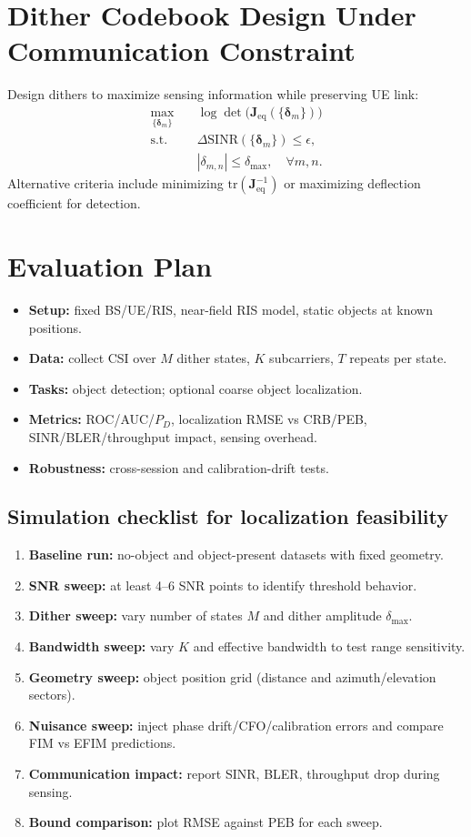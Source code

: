 \documentclass[11pt,a4paper]{article}
\newcommand{\tr}{\mathrm{tr}}
\begin{document}
\section{Dither Codebook Design Under Communication Constraint}
Design dithers to maximize sensing information while preserving UE link:
\begin{align}
\max_{\{\bm{\delta}_m\}} \quad & \log\det\!\big(\mathbf{J}_{\mathrm{eq}}(\{\bm{\delta}_m\})\big) \\
\text{s.t.}\quad
& \Delta\mathrm{SINR}(\{\bm{\delta}_m\}) \le \epsilon, \\
& |\delta_{m,n}| \le \delta_{\max},\quad \forall m,n.
\end{align}
Alternative criteria include minimizing $\tr(\mathbf{J}_{\mathrm{eq}}^{-1})$ or maximizing deflection coefficient for detection.

\section{Evaluation Plan}
\begin{itemize}
\item \textbf{Setup:} fixed BS/UE/RIS, near-field RIS model, static objects at known positions.
\item \textbf{Data:} collect CSI over $M$ dither states, $K$ subcarriers, $T$ repeats per state.
\item \textbf{Tasks:} object detection; optional coarse object localization.
\item \textbf{Metrics:} ROC/AUC/$P_D$, localization RMSE vs CRB/PEB, SINR/BLER/throughput impact, sensing overhead.
\item \textbf{Robustness:} cross-session and calibration-drift tests.
\end{itemize}

\subsection{Simulation checklist for localization feasibility}
\begin{enumerate}
\item \textbf{Baseline run:} no-object and object-present datasets with fixed geometry.
\item \textbf{SNR sweep:} at least 4--6 SNR points to identify threshold behavior.
\item \textbf{Dither sweep:} vary number of states $M$ and dither amplitude $\delta_{\max}$.
\item \textbf{Bandwidth sweep:} vary $K$ and effective bandwidth to test range sensitivity.
\item \textbf{Geometry sweep:} object position grid (distance and azimuth/elevation sectors).
\item \textbf{Nuisance sweep:} inject phase drift/CFO/calibration errors and compare FIM vs EFIM predictions.
\item \textbf{Communication impact:} report SINR, BLER, throughput drop during sensing.
\item \textbf{Bound comparison:} plot RMSE against PEB for each sweep.
\end{enumerate}
\end{document}
